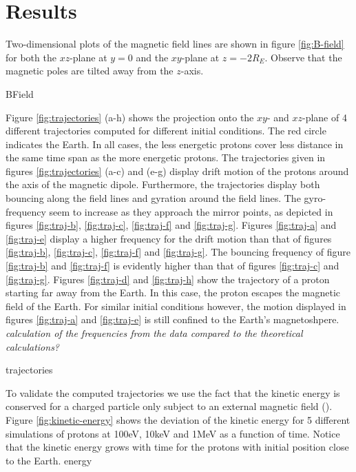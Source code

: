 \section{Results}
Two-dimensional plots of the magnetic field lines are shown in figure \ref{fig:B-field} for both the $xz$-plane at $y=0$ and the $xy$-plane at $z = -2R_E$. 
Observe that the magnetic poles are tilted away from the $z$-axis.

{BField}


Figure \ref{fig:trajectories} (a-h) shows the projection onto the $xy$- and $xz$-plane of 4 different trajectories computed for different initial conditions. 
The red circle indicates the Earth.
In all cases, the less energetic protons cover less distance in the same time span as the more energetic protons. 
The trajectories given in figures \ref{fig:trajectories} (a-c) and (e-g) display drift motion of the protons around the axis of the magnetic dipole.
Furthermore, the trajectories display both bouncing along the field lines and gyration around the field lines.
The gyro-frequency seem to increase as they approach the mirror points, as depicted in figures \ref{fig:traj-b}, \ref{fig:traj-c}, \ref{fig:traj-f} and \ref{fig:traj-g}.
Figures \ref{fig:traj-a} and \ref{fig:traj-e} display a higher frequency for the drift motion than that of figures \ref{fig:traj-b}, \ref{fig:traj-c}, \ref{fig:traj-f} and \ref{fig:traj-g}.
The bouncing frequency of figure \ref{fig:traj-b} and \ref{fig:traj-f} is evidently higher than that of figures \ref{fig:traj-c} and \ref{fig:traj-g}.
Figures \ref{fig:traj-d} and \ref{fig:traj-h} show the trajectory of a proton starting far away from the Earth.
In this case, the proton escapes the magnetic field of the Earth.
For similar initial conditions however, the motion displayed in figures \ref{fig:traj-a} and \ref{fig:traj-e} is still confined to the Earth's magnetoshpere.
\textit{calculation of the frequencies from the data compared to the theoretical calculations?}

{trajectories}

To validate the computed trajectories we use the fact that the kinetic energy is conserved for a charged particle only subject to an external magnetic field (\cite{griffiths_2024}). 
Figure \ref{fig:kinetic-energy} shows the deviation of the kinetic energy for 5 different simulations of protons at 100eV, 10keV and 1MeV as a function of time. 
Notice that the kinetic energy grows with time for the protons with initial position close to the Earth. 
{energy} %
